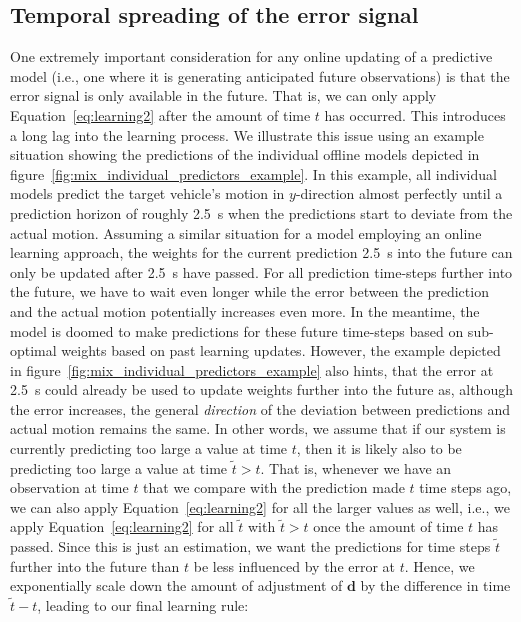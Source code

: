 \subsection{Temporal spreading of the error signal}%
\label{subsec:temporal_spreading_of_the_error_signal}

One extremely important consideration for any online updating of a predictive model (i.e., one where it is generating anticipated future observations) is that the error signal is only available in the future.
That is, we can only apply Equation~\eqref{eq:learning2} after the amount of time $t$ has occurred.  
This introduces a long lag into the learning process.  
We illustrate this issue using an example situation showing the predictions of the individual offline models depicted in figure~\ref{fig:mix_individual_predictors_example}.
In this example, all individual models predict the target vehicle's motion in $y$-direction almost perfectly until a prediction horizon of roughly \SI{2.5}{\second} when the predictions start to deviate from the actual motion.
Assuming a similar situation for a model employing an online learning approach, the weights for the current prediction \SI{2.5}{\second} into the future can only be updated after \SI{2.5}{\second} have passed. 
For all prediction time-steps further into the future, we have to wait even longer while the error between the prediction and the actual motion potentially increases even more.
In the meantime, the model is doomed to make predictions for these future time-steps based on sub-optimal weights based on past learning updates.
However, the example depicted in figure~\ref{fig:mix_individual_predictors_example} also hints, that the error at \SI{2.5}{\second} could already be used to update weights further into the future as, although the error increases, the general \emph{direction} of the deviation between predictions and actual motion remains the same. 
In other words, we assume that if our system is currently predicting too large a value at time $t$, then it is likely also to be predicting too large a value at time $ \tilde{t} > t$.
That is, whenever we have an observation at time $t$ that we compare with the prediction made $t$ time steps ago, we can also apply Equation~\eqref{eq:learning2} for all the larger values as well, i.e., we apply Equation~\eqref{eq:learning2} for all $ \tilde{t}$ with $ \tilde{t} > t$ once the amount of time $t$ has passed.
Since this is just an estimation, we want the predictions for time steps $ \tilde{t} $ further into the future than $t$ be less influenced by the error at $t$.
Hence, we exponentially scale down the amount of adjustment of $\mathbf{d}$ by the difference in time $ \tilde{t}-t$, leading to our final learning rule:


